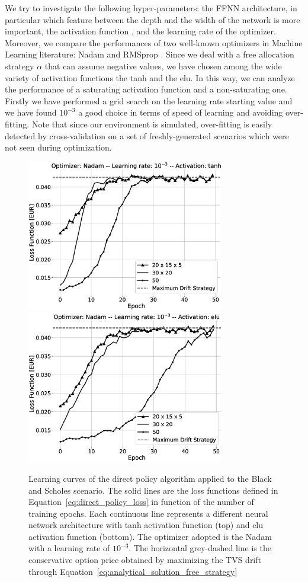 \documentclass[runningheads]{m2ef}
\newcommand{\change}[1]{{\color{red} {#1}}}%
\newcommand{\changeB}[1]{{\color{blue} {#1}}}%
\begin{document}
We try to investigate the following hyper-parameters: the FFNN architecture, in particular which feature between the depth and the width of the network is more important, the activation function\change{,} and the learning rate of the optimizer. Moreover, we compare the performances of two well-known optimizers in Machine Learning literature: Nadam \cite{Dozat2016} and RMSprop \cite{Hiton2012}. Since we deal with a free allocation strategy $\alpha$ that can assume negative values, we have chosen among the wide variety of activation functions \change{\cite{Goodfellow2016}} the tanh and the elu. In this way, we can analyze the performance of a saturating activation function and a non-saturating one. Firstly we have performed a grid search on the learning rate starting value and we have found $10^{-3}$ a good choice in terms of speed of learning and avoiding over-fitting. \changeB{Note that since our environment is simulated, over-fitting is easily detected by cross-validation on a set of freshly-generated scenarios which were not seen during optimization.}
 \begin{figure}[h!]
	\centering
	\includegraphics[width=3.4in]{BS_fine_tuning_Nadam_tanh_grey.eps}
	\includegraphics[width=3.4in]{BS_fine_tuning_Nadam_elu_grey.eps}
	\caption{Learning curves of the direct policy algorithm applied to the Black and Scholes \change{scenario}. The solid lines are the loss functions defined in Equation~\eqref{eq:direct_policy_loss} in function of the number of training epochs. Each continuous line represents a different neural network architecture with tanh activation function (top) and elu activation function (bottom). The optimizer adopted is the Nadam with a learning rate of $10^{-3}$. The horizontal grey-dashed line is the conservative option price obtained by maximizing the TVS drift through Equation~\eqref{eq:analytical_solution_free_strategy}}
	\label{fig:result_bs_nadam}
\end{figure}  
\end{document}
